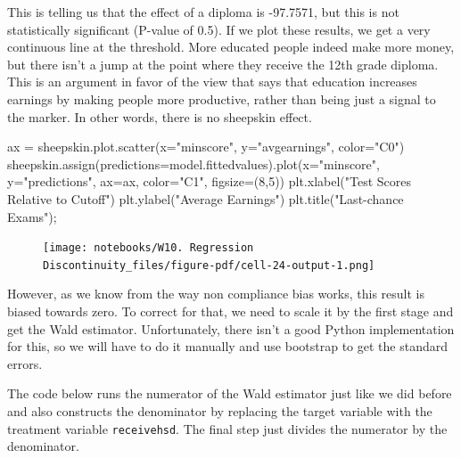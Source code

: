 \documentclass[
  letterpaper,
  DIV=11,
  numbers=noendperiod]{scrreprt}
\newenvironment{Shaded}{\begin{snugshade}}{\end{snugshade}}
\newcommand{\DecValTok}[1]{\textcolor[rgb]{0.68,0.00,0.00}{#1}}
\newcommand{\NormalTok}[1]{\textcolor[rgb]{0.00,0.23,0.31}{#1}}
\newcommand{\OperatorTok}[1]{\textcolor[rgb]{0.37,0.37,0.37}{#1}}
\newcommand{\StringTok}[1]{\textcolor[rgb]{0.13,0.47,0.30}{#1}}
\begin{document}
This is telling us that the effect of a diploma is -97.7571, but this is
not statistically significant (P-value of 0.5). If we plot these
results, we get a very continuous line at the threshold. More educated
people indeed make more money, but there isn't a jump at the point where
they receive the 12th grade diploma. This is an argument in favor of the
view that says that education increases earnings by making people more
productive, rather than being just a signal to the marker. In other
words, there is no sheepskin effect.

\begin{Shaded}
\begin{Highlighting}[]
\NormalTok{ax }\OperatorTok{=}\NormalTok{ sheepskin.plot.scatter(x}\OperatorTok{=}\StringTok{"minscore"}\NormalTok{, y}\OperatorTok{=}\StringTok{"avgearnings"}\NormalTok{, color}\OperatorTok{=}\StringTok{"C0"}\NormalTok{)}
\NormalTok{sheepskin.assign(predictions}\OperatorTok{=}\NormalTok{model.fittedvalues).plot(x}\OperatorTok{=}\StringTok{"minscore"}\NormalTok{, y}\OperatorTok{=}\StringTok{"predictions"}\NormalTok{, ax}\OperatorTok{=}\NormalTok{ax, color}\OperatorTok{=}\StringTok{"C1"}\NormalTok{, figsize}\OperatorTok{=}\NormalTok{(}\DecValTok{8}\NormalTok{,}\DecValTok{5}\NormalTok{))}
\NormalTok{plt.xlabel(}\StringTok{"Test Scores Relative to Cutoff"}\NormalTok{)}
\NormalTok{plt.ylabel(}\StringTok{"Average Earnings"}\NormalTok{)}
\NormalTok{plt.title(}\StringTok{"Last{-}chance Exams"}\NormalTok{)}\OperatorTok{;}
\end{Highlighting}
\end{Shaded}

\begin{figure}[H]

{\centering \texttt{[image: notebooks/W10. Regression Discontinuity\_files/figure-pdf/cell-24-output-1.png]}

}

\end{figure}

However, as we know from the way non compliance bias works, this result
is biased towards zero. To correct for that, we need to scale it by the
first stage and get the Wald estimator. Unfortunately, there isn't a
good Python implementation for this, so we will have to do it manually
and use bootstrap to get the standard errors.

The code below runs the numerator of the Wald estimator just like we did
before and also constructs the denominator by replacing the target
variable with the treatment variable \texttt{receivehsd}. The final step
just divides the numerator by the denominator.
\end{document}
